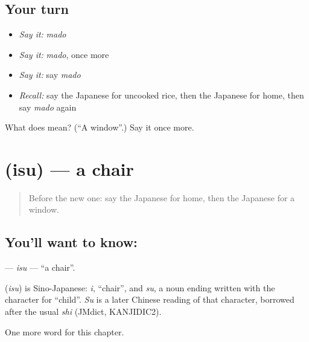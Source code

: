 \subsection*{Your turn}
\begin{itemize}
\raggedright
  \item \emph{Say it:} \emph{mado}
  \item \emph{Say it:} \emph{mado}, once more
  \item \emph{Say it:} say \emph{mado}
  \item \emph{Recall:} say the Japanese for uncooked rice, then the Japanese for home, then say \emph{mado} again
\end{itemize}

\begin{tcolorbox}[breakable,colback=teal!4,colframe=teal!35!black,title={Before you move on}]
What does  mean? (\textquotedblleft{}A window\textquotedblright{}.) Say it once more.
\end{tcolorbox}
\section[\texorpdfstring{\ja{いす} (isu)}{いす (isu)}]{ (isu) — a chair}

\label{lesson:JA-C37-isu}



\begin{quote}
Before the new one: say the Japanese for home, then the Japanese for a window.
\end{quote}

\subsection*{You'll want to know: }
\textbf{} — \emph{isu} — \textquotedblleft{}a chair\textquotedblright{}.

\begin{cousinweb}
\textbf{} (\emph{isu}) is Sino-Japanese: \emph{i}, \textquotedblleft{}chair\textquotedblright{}, and \emph{su}, a noun ending written with the character for \textquotedblleft{}child\textquotedblright{}. \emph{Su} is a later Chinese reading of that character, borrowed after the usual \emph{shi} (JMdict, KANJIDIC2).
\end{cousinweb}

\begin{grammarlens}[title={What you've built}]
One more word for this chapter.
\end{grammarlens}

